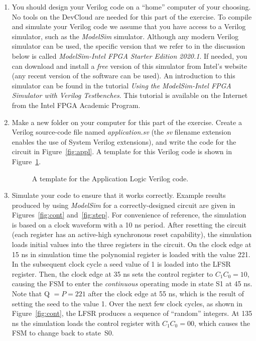 \documentclass[epsfig,10pt,fullpage]{article}
\begin{document}
\begin{enumerate}
\item
You should design your Verilog code on a ``home'' computer of your choosing. 
No tools on the DevCloud are needed for this part of the exercise. To compile and simulate
your Verilog code we assume that you have access to a Verilog simulator, such as 
the {\it ModelSim} simulator. Although any modern Verilog simulator can be used, the specific
version that we refer to in the discussion below is called 
{\it ModelSim-Intel FPGA Starter Edition 2020.1}. If needed, you can download and 
install a {\it free} version of this simulator from Intel's website (any recent version of
the software can be used). An introduction to this simulator can be found in 
the tutorial {\it Using the ModelSim-Intel FPGA Simulator with Verilog Testbenches}.
This tutorial is available on the Internet from the Intel FPGA Academic Program.
\item
Make a new folder on your computer for this part of the exercise. Create a Verilog
source-code file named {\it application.sv} (the {\it sv} filename extension enables the 
use of System Verilog extensions), and write the code for the circuit in 
Figure~\ref{fig:appl}. A template for this Verilog code is shown in Figure~\ref{fig:code}.

\begin{figure}[H]
\begin{center}

\end{center}
\caption{A template for the Application Logic Verilog code.}
\label{fig:code}
\end{figure}

\item
Simulate your code to ensure that it works correctly. Example results produced by using
{\it ModelSim} for a correctly-designed circuit are given in Figures~\ref{fig:cont}
and~\ref{fig:step}. For convenience of reference, the simulation is based on a clock 
waveform with a 10 ns period. After resetting the circuit 
(each register has an active-high synchronous reset 
capability), the simulation loads initial values into the three registers in the circuit. 
On the clock edge at 15 ns in simulation time the polynomial register is loaded with the
value 221. In the subsequent clock cycle a seed value of 1 is loaded into the LFSR register. 
Then, the clock edge at 35 ns sets the control register to $C_1 C_0 = 10$, causing the 
FSM to enter the {\it continuous} operating mode in state S1 at 45 ns.
Note that Q $= P = 221$ after the clock edge at 55 ns, which is the 
result of setting the seed to the value 1.  Over the next few clock cycles, as shown 
in Figure~\ref{fig:cont}, the LFSR produces a sequence of ``random'' integers. 
At 135 ns the simulation loads the control register with $C_1 C_0 = 00$, which causes the 
FSM to change back to state~S0.


\end{enumerate}
\end{document}

